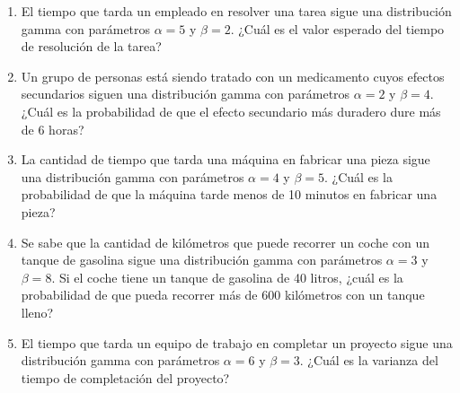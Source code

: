 \begin{Ejer}
\begin{enumerate}
    \item El tiempo que tarda un empleado en resolver una tarea sigue una distribución gamma con parámetros $\alpha=5$ y $\beta=2$. ¿Cuál es el valor esperado del tiempo de resolución de la tarea?
    \item Un grupo de personas está siendo tratado con un medicamento cuyos efectos secundarios siguen una distribución gamma con parámetros $\alpha=2$ y $\beta=4$. ¿Cuál es la probabilidad de que el efecto secundario más duradero dure más de 6 horas?
    \item La cantidad de tiempo que tarda una máquina en fabricar una pieza sigue una distribución gamma con parámetros $\alpha=4$ y $\beta=5$. ¿Cuál es la probabilidad de que la máquina tarde menos de 10 minutos en fabricar una pieza?
    \item Se sabe que la cantidad de kilómetros que puede recorrer un coche con un tanque de gasolina sigue una distribución gamma con parámetros $\alpha=3$ y $\beta=8$. Si el coche tiene un tanque de gasolina de 40 litros, ¿cuál es la probabilidad de que pueda recorrer más de 600 kilómetros con un tanque lleno?
    \item El tiempo que tarda un equipo de trabajo en completar un proyecto sigue una distribución gamma con parámetros $\alpha=6$ y $\beta=3$. ¿Cuál es la varianza del tiempo de completación del proyecto?
    
\end{enumerate}
\end{Ejer} 


